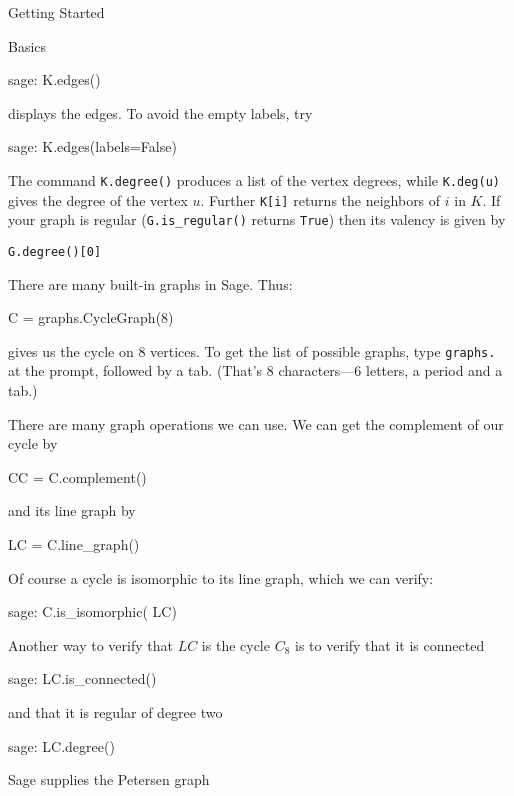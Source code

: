 \begin{chap}{Getting Started}
\begin{sect}{Basics}
\begin{sageexample}
    sage: K.edges() 
\end{sageexample}
displays the edges. To avoid the empty labels, try
\begin{sageexample}
    sage: K.edges(labels=False)
\end{sageexample}
%
\begin{para}
The command \verb|K.degree()| produces a list of the vertex degrees,
while \verb|K.deg(u)| gives the degree of the vertex $u$. Further 
\verb|K[i]| returns the neighbors of $i$ in $K$. If your graph is
regular (\verb|G.is_regular()| returns \verb|True|) then its valency
is given by
\end{para}
%
\begin{verbatim}
G.degree()[0]
\end{verbatim}
%
\begin{para}
There are many built-in graphs in Sage. Thus:
\end{para}
%
\begin{sageblock}
C = graphs.CycleGraph(8)
\end{sageblock}
%
\begin{para}
gives us the cycle on 8 vertices. To get the list of possible graphs,
type \verb|graphs.| at the prompt, followed by a tab. (That's 8 characters---6 letters,
a period and a tab.)
\end{para}
%
\begin{para}
There are many graph operations we can use. We can get the complement of
our cycle by
\end{para}
%
\begin{sageblock}
CC = C.complement()
\end{sageblock}
and its line graph by
\begin{sageblock}
LC = C.line_graph()
\end{sageblock}
Of course a cycle is isomorphic to its line graph, which we can verify:
\begin{sageexample}
sage: C.is_isomorphic( LC)
\end{sageexample}
%
\begin{para}
Another way to verify that $LC$ is the cycle $C_8$ is to verify that it
is connected
\end{para}
%
\begin{sageexample}
sage: LC.is_connected()
\end{sageexample}
and that it is regular of degree two
\begin{sageexample}
sage: LC.degree()
\end{sageexample}
Sage supplies the Petersen graph

\end{sect}
\end{chap}
